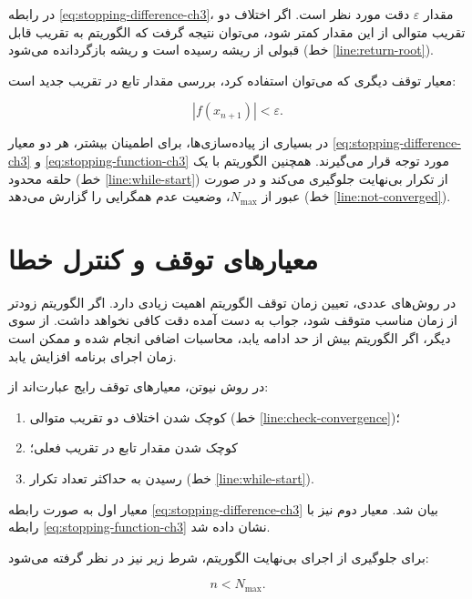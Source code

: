 در رابطه \eqref{eq:stopping-difference-ch3}، مقدار \(\varepsilon\) دقت مورد نظر است. اگر اختلاف دو تقریب متوالی از این مقدار کمتر شود، می‌توان نتیجه گرفت که الگوریتم به تقریب قابل قبولی از ریشه رسیده است و ریشه بازگردانده می‌شود (خط \ref{line:return-root}).

معیار توقف دیگری که می‌توان استفاده کرد، بررسی مقدار تابع در تقریب جدید است:

\begin{equation}
|f(x_{n+1})|<\varepsilon.
\label{eq:stopping-function-ch3}
\end{equation}

در بسیاری از پیاده‌سازی‌ها، برای اطمینان بیشتر، هر دو معیار \eqref{eq:stopping-difference-ch3} و \eqref{eq:stopping-function-ch3} مورد توجه قرار می‌گیرند. همچنین الگوریتم با یک حلقه محدود (خط \ref{line:while-start}) از تکرار بی‌نهایت جلوگیری می‌کند و در صورت عبور از \(N_{\max}\)، وضعیت عدم همگرایی را گزارش می‌دهد (خط \ref{line:not-converged}).

\section{معیارهای توقف و کنترل خطا}
\label{sec:stop}

در روش‌های عددی، تعیین زمان توقف الگوریتم اهمیت زیادی دارد. اگر الگوریتم زودتر از زمان مناسب متوقف شود، جواب به دست آمده دقت کافی نخواهد داشت. از سوی دیگر، اگر الگوریتم بیش از حد ادامه یابد، محاسبات اضافی انجام شده و ممکن است زمان اجرای برنامه افزایش یابد.

در روش نیوتن، معیارهای توقف رایج عبارت‌اند از:

\begin{enumerate}
    \item کوچک شدن اختلاف دو تقریب متوالی (خط \ref{line:check-convergence})؛
    \item کوچک شدن مقدار تابع در تقریب فعلی؛
    \item رسیدن به حداکثر تعداد تکرار (خط \ref{line:while-start}).
\end{enumerate}

معیار اول به صورت رابطه \eqref{eq:stopping-difference-ch3} بیان شد. معیار دوم نیز با رابطه \eqref{eq:stopping-function-ch3} نشان داده شد.

برای جلوگیری از اجرای بی‌نهایت الگوریتم، شرط زیر نیز در نظر گرفته می‌شود:

\begin{equation}
n<N_{\max}.
\label{eq:max-iteration-ch3}
\end{equation}

